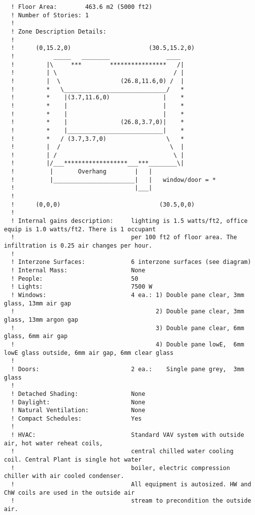 \begin{lstlisting}
  ! Floor Area:        463.6 m2 (5000 ft2)
  ! Number of Stories: 1
  !
  ! Zone Description Details:
  !
  !      (0,15.2,0)                      (30.5,15.2,0)
  !           _____   ________                ____
  !         |\     ***        ****************   /|
  !         | \                                 / |
  !         |  \                 (26.8,11.6,0) /  |
  !         *   \_____________________________/   *
  !         *    |(3.7,11.6,0)               |    *
  !         *    |                           |    *
  !         *    |                           |    *
  !         *    |               (26.8,3.7,0)|    *
  !         *    |___________________________|    *
  !         *   / (3.7,3.7,0)                 \   *
  !         |  /                               \  |
  !         | /                                 \ |
  !         |/___******************___***________\|
  !          |       Overhang        |   |
  !          |_______________________|   |   window/door = *
  !                                  |___|
  !
  !      (0,0,0)                            (30.5,0,0)
  !
  ! Internal gains description:     lighting is 1.5 watts/ft2, office equip is 1.0 watts/ft2. There is 1 occupant
  !                                 per 100 ft2 of floor area. The infiltration is 0.25 air changes per hour.
  !
  ! Interzone Surfaces:             6 interzone surfaces (see diagram)
  ! Internal Mass:                  None
  ! People:                         50
  ! Lights:                         7500 W
  ! Windows:                        4 ea.: 1) Double pane clear, 3mm glass, 13mm air gap
  !                                        2) Double pane clear, 3mm glass, 13mm argon gap
  !                                        3) Double pane clear, 6mm glass, 6mm air gap
  !                                        4) Double pane lowE,  6mm lowE glass outside, 6mm air gap, 6mm clear glass
  !
  ! Doors:                          2 ea.:    Single pane grey,  3mm glass
  !
  ! Detached Shading:               None
  ! Daylight:                       None
  ! Natural Ventilation:            None
  ! Compact Schedules:              Yes
  !
  ! HVAC:                           Standard VAV system with outside air, hot water reheat coils,
  !                                 central chilled water cooling coil. Central Plant is single hot water
  !                                 boiler, electric compression chiller with air cooled condenser.
  !                                 All equipment is autosized. HW and ChW coils are used in the outside air
  !                                 stream to precondition the outside air.

\end{lstlisting}

